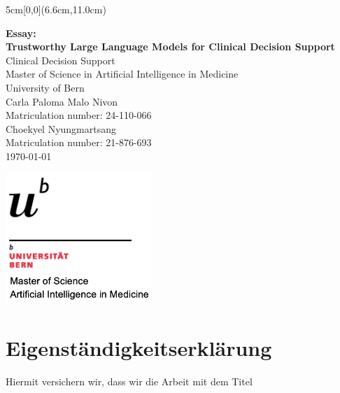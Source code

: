 \documentclass[12pt,a4paper]{scrreprt}
\begin{document}
\begin{titlepage}
	\begin{textblock*}{5cm}[0,0](6.6cm,11.0cm)
	\end{textblock*}
	\begin{center}
		\vspace*{2cm}
    \Huge{\textbf{Essay:}}\\
		\Huge{\textbf{Trustworthy Large Language Models for Clinical Decision Support}}\\
    \vspace{3em}
		\Large{Clinical Decision Support}\\
    \vspace{0.5em}
    \normalsize Master of Science in Artificial Intelligence in Medicine\\
    \normalsize University of Bern\\
		\vspace{10em}
        \Large{Carla Paloma Malo Nivon}\\
        \vspace{0.5em}
        \normalsize Matriculation number: 24-110-066\\
        \vspace{4em}
        \Large{Choekyel Nyungmartsang}\\
        \vspace{0.5em}
        \normalsize Matriculation number: 21-876-693\\
		\vfill
        \Large{\today}\\

    
	\end{center}
 
\newpage

\thispagestyle{empty}
\begin{flushright}
    \includegraphics[width=5.5cm]{university_logo.png} %
\end{flushright}
\vspace{2cm}
\section*{Eigenständigkeitserklärung}
{\small
Hiermit versichern wir, dass wir die Arbeit mit dem Titel

}
\end{titlepage}
\end{document}
